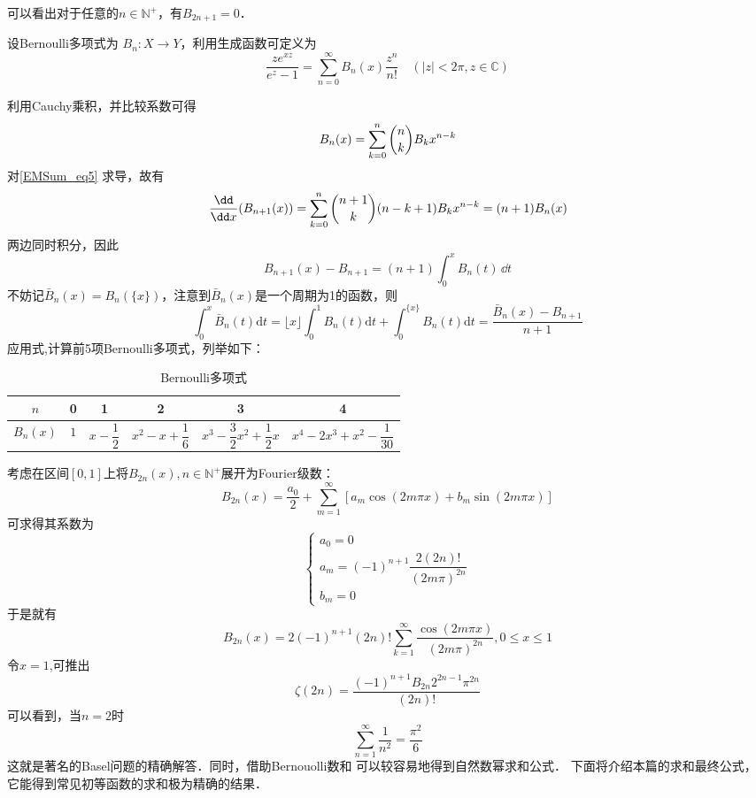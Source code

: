 可以看出对于任意的$n\in\mathbb N^+$，有$B_{2n+1}=0$．
\begin{definition}{}
设Bernoulli多项式为 $B_{n}:X\to Y$，利用生成函数可定义为
\begin{equation}{}
    \frac{ze^{xz}}{e^{z}-1}=\sum_{n=0}^{\infty}B_{n}(x)\frac{z^{n}}{n!}
    \quad(|z|<2\pi,z\in{\mathbb C})
\end{equation}	
\end{definition}
利用Cauchy乘积，并比较系数可得
\begin{equation}\label{EMSum_eq5}
    B_{n}(x)=\sum_{k=0}^{n}\dbinom{n}{k}B_{k}x^{n-k}
\end{equation}
对\autoref{EMSum_eq5} 求导，故有
\begin{equation}
    \frac{\dd}{\dd x}(B_{n+1}(x))=\sum_{k=0}^{n}\dbinom{n+1}{k}(n-k+1)B_{k}x^{n-k}=(n+1)B_{n}(x)
\end{equation}
两边同时积分，因此
\begin{equation}
    B_{n+1}(x)-B_{n+1}=(n+1)\int_{0}^{x}B_{n}(t)\,\dd t
\end{equation}
不妨记$\bar{B}_{n}(x)=B_{n}(\{x\})$，注意到$\bar{B}_{n}(x)$是一个周期为1的函数，则
\begin{equation}\label{EMSum_eq6}
    \int_{0}^{x}\bar{B}_{n}(t)\mathrm{d}t
    =\lfloor x\rfloor\int_{0}^{1}B_{n}(t)\mathrm{d}t+\int_{0}^{\{x\}}B_{n}(t)\mathrm{d}t
    =\frac{\bar{B}_{n}(x)-B_{n+1}}{n+1}
\end{equation}
应用式,计算前5项Bernoulli多项式，列举如下：
\begin{table}[ht]
\centering
\caption{Bernoulli多项式}
\begin{tabular}{|c|c|c|c|c|c|}
\hline
$n$ & 0 & 1 & 2 & 3 & 4\\
\hline
$B_{n}(x)$ & $1$ & $x-\dfrac{1}{2}$ & $x^{2}-x+\dfrac{1}{6}$ & $x^{3}-\dfrac{3}{2}x^{2}+\dfrac{1}{2}x$ & $x^{4}-2x^{3}+x^{2}-\dfrac{1}{30}$\\
\hline
\end{tabular}
\end{table}
考虑在区间$[0,1]$上将$B_{2n}(x),n\in{\mathbb N^{+}}$展开为Fourier级数：
\[
    B_{2n}(x)=\frac{a_{0}}{2}+\sum_{m=1}^{\infty}[a_{m}\cos(2m\pi x)+b_{m}\sin(2m\pi x)]
\]
可求得其系数为
\begin{equation}
\begin{cases}
    a_{0}=0\\
    a_{m}=(-1)^{n+1}\dfrac{2(2n)!}{(2m\pi)^{2n}}\\
    b_{m}=0
\end{cases}
\end{equation}
于是就有
\begin{equation}
    B_{2n}(x)=2(-1)^{n+1}(2n)!\sum_{k=1}^{\infty}\frac{\cos(2m\pi x)}{(2m\pi)^{2n}},0\leqslant x\leqslant1
\end{equation}
令$x=1$,可推出
\begin{equation}
    \zeta(2n)=\frac{(-1)^{n+1}B_{2n}2^{2n-1}\pi^{2n}}{(2n)!}
\end{equation}
可以看到，当$n=2$时
\[
    \sum_{n=1}^{\infty}\frac{1}{n^2}=\frac{\pi^2}{6}
\]
这就是著名的Basel问题的精确解答．同时，借助Bernouolli数和 可以较容易地得到自然数幂求和公式．
下面将介绍本篇的求和最终公式，它能得到常见初等函数的求和极为精确的结果．

